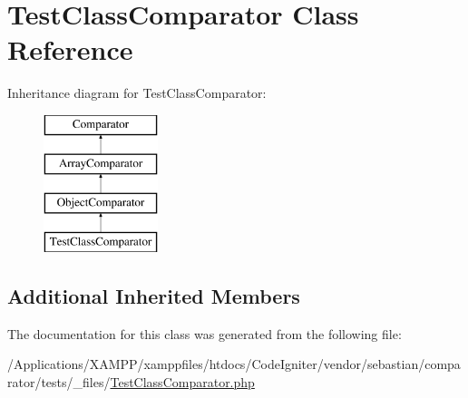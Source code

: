 \hypertarget{class_sebastian_bergmann_1_1_comparator_1_1_test_class_comparator}{}\section{Test\+Class\+Comparator Class Reference}
\label{class_sebastian_bergmann_1_1_comparator_1_1_test_class_comparator}
Inheritance diagram for Test\+Class\+Comparator\+:\begin{figure}[H]
\begin{center}
\leavevmode
\includegraphics[height=4.000000cm]{class_sebastian_bergmann_1_1_comparator_1_1_test_class_comparator}
\end{center}
\end{figure}
\subsection*{Additional Inherited Members}


The documentation for this class was generated from the following file\+:\begin{DoxyCompactItemize}
\item 
/\+Applications/\+X\+A\+M\+P\+P/xamppfiles/htdocs/\+Code\+Igniter/vendor/sebastian/comparator/tests/\+\_\+files/\mbox{\hyperlink{_test_class_comparator_8php}{Test\+Class\+Comparator.\+php}}\end{DoxyCompactItemize}

